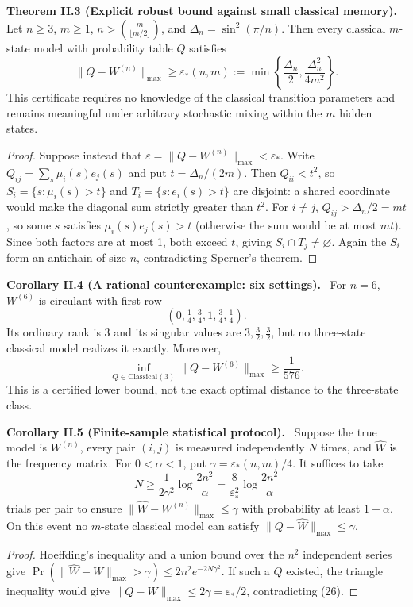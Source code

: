 \documentclass[11pt,a4paper,oneside]{book}
\newcommand{\statement}[3]{\par\medskip\noindent\textbf{#1 #2 (#3).}\ }
\begin{document}
\statement{Theorem}{II.3}{Explicit robust bound against small classical memory} Let $n\ge3$, $m\ge1$, $n>\binom m{\lfloor m/2\rfloor}$, and $\Delta_n=\sin^2(\pi/n)$. Then every classical $m$-state model with probability table $Q$ satisfies
\begin{equation}\|Q-W^{(n)}\|_{\max}\ge\varepsilon_*(n,m):=\min\left\{\frac{\Delta_n}2,\frac{\Delta_n^2}{4m^2}\right\}.\tag{26}\end{equation}
This certificate requires no knowledge of the classical transition parameters and remains meaningful under arbitrary stochastic mixing within the $m$ hidden states.
\begin{proof}Suppose instead that $\varepsilon=\|Q-W^{(n)}\|_{\max}<\varepsilon_*$. Write $Q_{ij}=\sum_s\mu_i(s)e_j(s)$ and put $t=\Delta_n/(2m)$. Then $Q_{ii}<t^2$, so $S_i=\{s:\mu_i(s)>t\}$ and $T_i=\{s:e_i(s)>t\}$ are disjoint: a shared coordinate would make the diagonal sum strictly greater than $t^2$. For $i\ne j$, $Q_{ij}>\Delta_n/2=mt$, so some $s$ satisfies $\mu_i(s)e_j(s)>t$ (otherwise the sum would be at most $mt$). Since both factors are at most 1, both exceed $t$, giving $S_i\cap T_j\ne\varnothing$. Again the $S_i$ form an antichain of size $n$, contradicting Sperner's theorem.\end{proof}
\statement{Corollary}{II.4}{A rational counterexample: six settings} For $n=6$, $W^{(6)}$ is circulant with first row
\[\left(0,\tfrac14,\tfrac34,1,\tfrac34,\tfrac14\right).\]
Its ordinary rank is 3 and its singular values are $3,\frac32,\frac32$, but no three-state classical model realizes it exactly. Moreover,
\begin{equation}\inf_{Q\in\mathrm{Classical}(3)}\|Q-W^{(6)}\|_{\max}\ge\frac1{576}.\tag{27}\end{equation}
This is a certified lower bound, not the exact optimal distance to the three-state class.
\statement{Corollary}{II.5}{Finite-sample statistical protocol} Suppose the true model is $W^{(n)}$, every pair $(i,j)$ is measured independently $N$ times, and $\widehat W$ is the frequency matrix. For $0<\alpha<1$, put $\gamma=\varepsilon_*(n,m)/4$. It suffices to take
\begin{equation}N\ge\frac1{2\gamma^2}\log\frac{2n^2}\alpha=\frac8{\varepsilon_*^2}\log\frac{2n^2}\alpha\tag{28}\end{equation}
trials per pair to ensure $\|\widehat W-W^{(n)}\|_{\max}\le\gamma$ with probability at least $1-\alpha$. On this event no $m$-state classical model can satisfy $\|Q-\widehat W\|_{\max}\le\gamma$.
\begin{proof}Hoeffding's inequality and a union bound over the $n^2$ independent series give $\Pr(\|\widehat W-W\|_{\max}>\gamma)\le2n^2e^{-2N\gamma^2}$. If such a $Q$ existed, the triangle inequality would give $\|Q-W\|_{\max}\le2\gamma=\varepsilon_*/2$, contradicting (26).\end{proof}
\end{document}
